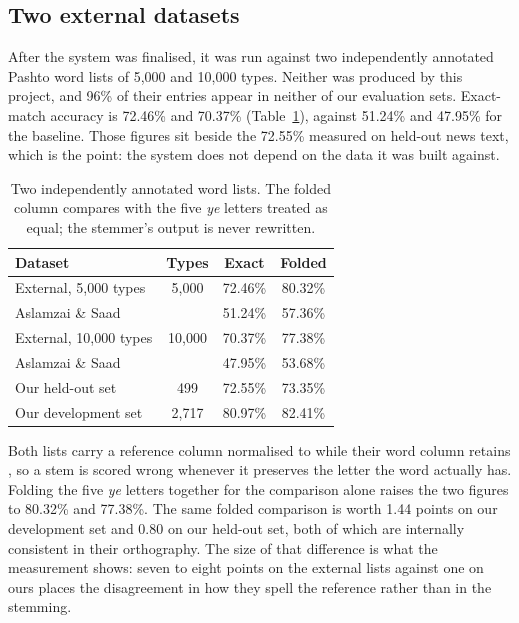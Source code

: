 \documentclass[conference]{IEEEtran}
\newcommand{\ps}[1]{{\pashtofont\textpashto{#1}}}
\begin{document}
\subsection{Two external datasets}
\label{sec:external}

After the system was finalised, it was run against two independently annotated
Pashto word lists of 5{,}000 and 10{,}000 types. Neither was produced by this
project, and 96\% of their entries appear in neither of our evaluation sets.
Exact-match accuracy is 72.46\% and 70.37\% (Table~\ref{tab:external}), against
51.24\% and 47.95\% for the baseline. Those figures sit beside the 72.55\% measured on held-out news text,
which is the point: the system does not depend on the data it was built
against.

\begin{table}[t]
\caption{Two independently annotated word lists. The folded column compares
with the five \emph{ye} letters treated as equal; the stemmer's output is never
rewritten.}
\label{tab:external}
\centering
\begin{tabular}{lccc}
\toprule
Dataset & Types & Exact & Folded\\
\midrule
External, 5{,}000 types & 5{,}000 & 72.46\% & 80.32\%\\
\quad Aslamzai \& Saad & & 51.24\% & 57.36\%\\
External, 10{,}000 types & 10{,}000 & 70.37\% & 77.38\%\\
\quad Aslamzai \& Saad & & 47.95\% & 53.68\%\\
\midrule
Our held-out set & 499 & 72.55\% & 73.35\%\\
Our development set & 2{,}717 & 80.97\% & 82.41\%\\
\bottomrule
\end{tabular}
\end{table}

Both lists carry a reference column normalised to \ps{ی} while their word column
retains \ps{ي}, so a stem is scored wrong whenever it preserves the letter the
word actually has. Folding the five \emph{ye} letters together for the
comparison alone raises the two figures to 80.32\% and 77.38\%. The same folded
comparison is worth 1.44 points on our development set and 0.80 on our held-out
set, both of which are internally consistent in their orthography. The size of
that difference is what the measurement shows: seven to eight points on the
external lists against one on ours places the disagreement in how they spell the
reference rather than in the stemming.
\end{document}
